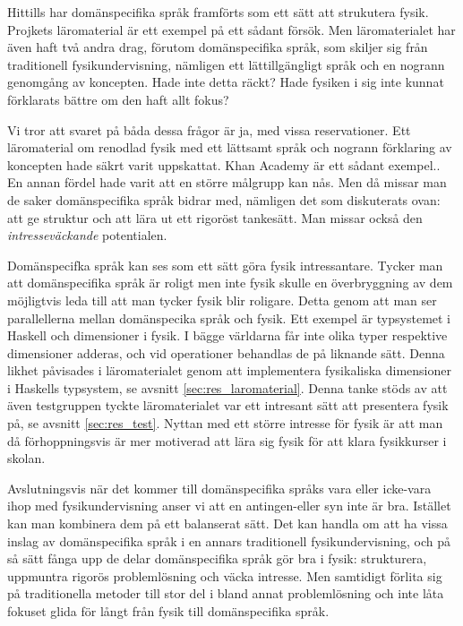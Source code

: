 \begin{draft}
Hittills har domänspecifika språk framförts som ett sätt att strukutera fysik. Projkets läromaterial är ett exempel på ett sådant
försök. Men läromaterialet har även haft två andra drag, förutom domänspecifika
språk, som skiljer sig från traditionell fysikundervisning, nämligen ett
lättillgängligt språk och en nogrann genomgång av koncepten. Hade inte detta
räckt? Hade fysiken i sig inte kunnat förklarats bättre om den haft allt fokus?

Vi tror att svaret på båda dessa frågor är ja, med vissa reservationer. Ett läromaterial om renodlad fysik med ett lättsamt språk och nogrann förklaring av koncepten hade säkrt varit uppskattat. Khan Academy är ett sådant exempel.\cite{khan}. En annan fördel hade varit att en större målgrupp kan nås. Men då missar man de saker domänspecifika språk bidrar med, nämligen det som diskuterats ovan: att ge struktur och att lära ut ett rigoröst tankesätt. Man missar också den \textit{intresseväckande} potentialen.

Domänspecifka språk kan ses som ett sätt göra fysik intressantare. Tycker man att domänspecifika språk är roligt
men inte fysik skulle en överbryggning av dem möjligtvis leda till att man tycker fysik
blir roligare. Detta genom att man ser parallellerna mellan
domänspecika språk och fysik. Ett exempel är typsystemet i Haskell och
dimensioner i fysik. I bägge världarna får inte olika typer respektive
dimensioner adderas, och vid operationer behandlas de på liknande sätt. Denna
likhet påvisades i läromaterialet genom att implementera fysikaliska dimensioner
i Haskells typsystem, se avsnitt \ref{sec:res_laromaterial}. Denna tanke stöds
av att även testgruppen tyckte läromaterialet var ett intresant sätt att
presentera fysik på, se avsnitt \ref{sec:res_test}. Nyttan med ett större
intresse för fysik är att man då förhoppningsvis är mer motiverad att lära sig
fysik för att klara fysikkurser i skolan. 

Avslutningsvis när det kommer till domänspecifika språks vara eller icke-vara ihop med fysikundervisning anser vi att en antingen-eller syn inte är bra. Istället kan man kombinera dem på ett balanserat sätt. Det kan handla om att ha vissa inslag av domänspecifika språk i en annars traditionell fysikundervisning, och på så sätt fånga upp de delar domänspecifika språk gör bra i fysik: strukturera, uppmuntra rigorös problemlösning och väcka intresse. Men samtidigt förlita sig på traditionella metoder till stor del i bland annat problemlösning och inte låta fokuset glida för långt från fysik till domänspecifika språk.



\end{draft}
